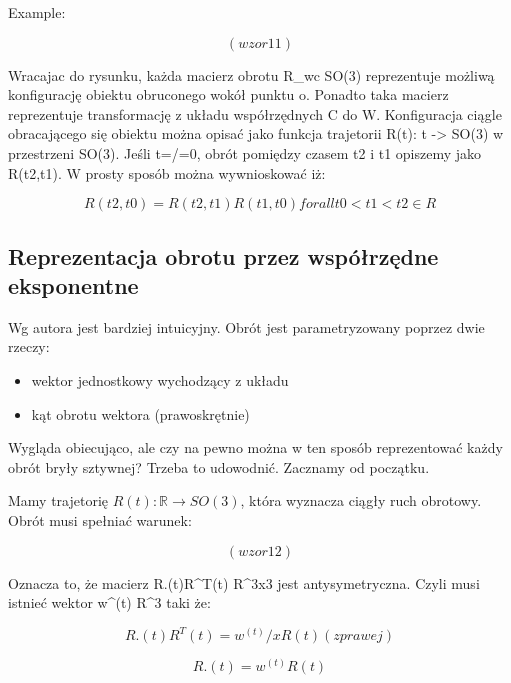 \documentclass[a4paper,12pt]{article}
\newcommand{\R}{\mathbb{R}}
\begin{document}
Example:

\begin{equation}
(wzor 11)
\end{equation}

Wracajac do rysunku, każda macierz obrotu R_wc \in SO(3) reprezentuje możliwą konfigurację obiektu obruconego wokół punktu o. Ponadto taka macierz reprezentuje transformację z układu współrzędnych C do W. Konfiguracja ciągle obracającego się obiektu można opisać jako funkcja trajetorii R(t): t -> SO(3) w przestrzeni SO(3). Jeśli t=/=0, obrót pomiędzy czasem t2 i t1 opiszemy jako R(t2,t1). W prosty sposób można wywnioskować iż:

\begin{equation}
R(t2,t0) = R(t2,t1)R(t1,t0) for all t0 < t1 < t2 \in R
\end{equation}

\subsection{Reprezentacja obrotu przez współrzędne eksponentne}

Wg autora jest bardziej intuicyjny. Obrót jest parametryzowany poprzez dwie rzeczy:

\begin{itemize}
\item wektor jednostkowy wychodzący z układu
\item kąt obrotu wektora (prawoskrętnie)
\end{itemize}

Wygląda obiecująco, ale czy na pewno można w ten sposób reprezentować każdy obrót bryły sztywnej? Trzeba to udowodnić. Zacznamy od początku.

Mamy trajetorię $R(t): \R \rightarrow SO(3)$, która wyznacza ciągły ruch obrotowy. Obrót musi spełniać warunek:

\begin{equation}
(wzor 12)
\end{equation}

Oznacza to, że macierz R.(t)R^T(t) \in R^3x3 jest antysymetryczna. Czyli musi istnieć wektor w^(t) \in R^3 taki że:

\begin{equation}
R.(t)R^T(t) = w^(t) / x R(t) (z prawej)
\end{equation}

\begin{equation}
R.(t) = w^(t)R(t)
\end{equation}
\end{document}

